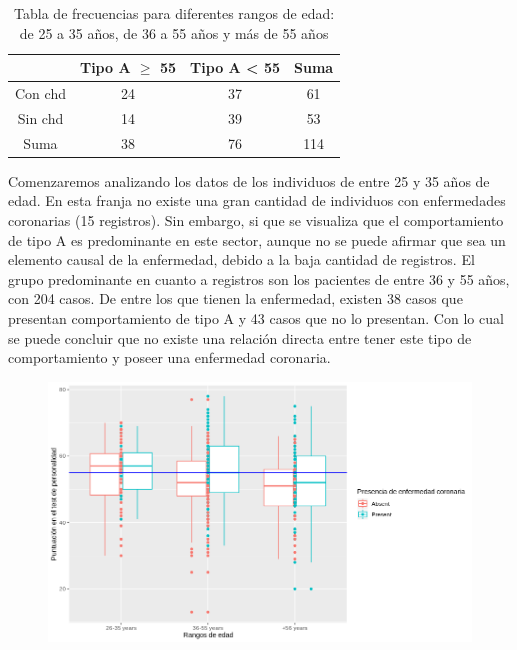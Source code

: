 \documentclass[a4paper, 9pt]{article}
\begin{document}
    \begin{table}[!htb]
        \centering
        \begin{tabular}{c|c|c|c|}
        \cline{2-4}
                                                       & Tipo A $\geq$ 55     & Tipo A \textless{} 55      & Suma \\ \hline
        \multicolumn{1}{|c|}{Con chd}     & 24                         & 37                         & 61   \\ \hline
        \multicolumn{1}{|c|}{Sin chd}     & 14                         & 39                         & 53   \\ \hline
        \multicolumn{1}{|c|}{Suma}                         & 38                         & 76                         & 114   \\ \hline
        \end{tabular}
        \caption{Tabla de frecuencias para diferentes rangos de edad: de 25 a 35 años, de 36 a 55 años y más de 55 años}
        \label{tab:my_label}
    \end{table}
    

Comenzaremos analizando los datos de los individuos de entre 25 y 35 años de edad. En esta franja no existe una gran cantidad de individuos con enfermedades coronarias (15 registros). Sin embargo, si que se visualiza que el comportamiento de tipo A es predominante en este sector, aunque no se puede afirmar que sea un elemento causal de la enfermedad, debido a la baja cantidad de registros. El grupo predominante en cuanto a registros son los pacientes de entre 36 y 55 años, con 204 casos. De entre los que tienen la enfermedad, existen 38 casos que presentan comportamiento de tipo A y 43 casos que no lo presentan. Con lo cual se puede concluir que no existe una relación directa entre tener este tipo de comportamiento y poseer una enfermedad coronaria. 

\vspace{3mm}

\begin{figure}
    \centering
    \includegraphics[scale=0.35]{images/question-4/plot2.png}
    \label{fig:question4-uplot1}
\end{figure}
\end{document}
